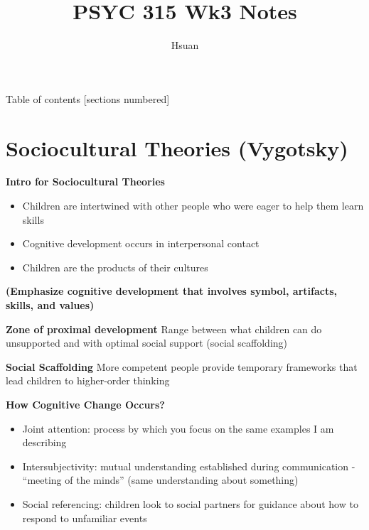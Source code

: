 \documentclass[11pt]{beamer}
\begin{document}
\title{PSYC 315 Wk3 Notes}
\author{
Hsuan}

\maketitle

\begin{frame}{Table of contents}
  [sections numbered]
  \tableofcontents%
\end{frame}
\section{{\bf{\LARGE{\color{blue}Sociocultural Theories (Vygotsky)}}}}
\begin{frame}{{\bf{\LARGE{\color{violet}Intro for Sociocultural Theories}}}}
\begin{itemize}
\item Children are intertwined with other people who were eager to help them learn skills\item Cognitive development occurs in interpersonal contact\item Children are the products of their cultures\end{itemize}

{\bf{\LARGE{\color{yellow}(Emphasize cognitive development that involves symbol, artifacts, skills, and values)}}}\leavevmode\newline
\end{frame}
\begin{frame}{{\bf{\LARGE{\color{violet}Zone of proximal development}}}}
Range between what children can do unsupported and with optimal social support (social scaffolding)\leavevmode\newline
\end{frame}
\begin{frame}{{\bf{\LARGE{\color{violet}Social Scaffolding}}}}
More competent people provide temporary frameworks that lead children to higher-order thinking\leavevmode\newline
\end{frame}
\begin{frame}{{\bf{\LARGE{\color{violet}How Cognitive Change Occurs?}}}}
\begin{itemize}
\item Joint attention: process by which you focus on the same examples I am describing\item Intersubjectivity: mutual understanding established during communication - “meeting of the minds” (same understanding about something)\item Social referencing: children look to social partners for guidance about how to respond to unfamiliar events\end{itemize}

\end{frame}
\end{document}
